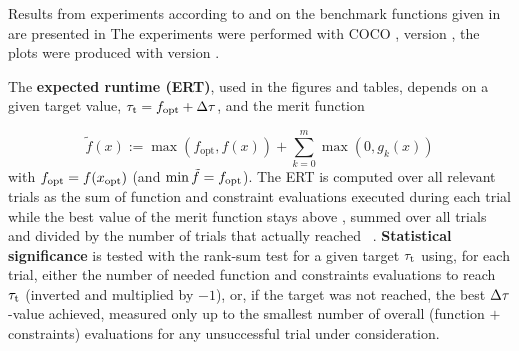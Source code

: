 \documentclass[sigconf]{acmart}
\begin{document}
Results from experiments according to \cite{hansen2016exp} and \cite{hansen2022anytime} on the
benchmark functions given in \cite{dufosse2022constrained} are
presented in
The experiments were performed with COCO \cite{hansen2020cocoplat}, version
\change{\version}, the plots were produced with version \change{\version}.

The \textbf{expected runtime (ERT)}, used in the figures and tables,
depends on a given target value, $\tau_\mathrm{t}=f_\mathrm{opt}+\Delta \tau$, and the merit
function

$$
\tilde{f}(x) := \max(f_{\text{opt}}, f(x))
+ \sum_{k=0}^{m} \max(0, g_k(x))
$$
with $f_\mathrm{opt} = f(x_{\text{opt}})$ (and $\min{\tilde{f}} = f_\mathrm{opt}$).
The ERT is computed over all relevant trials as the sum of
function and constraint evaluations executed during each trial
while the best value of the merit function stays above \fgtarget,
summed over all trials and divided by the
number of trials that actually reached \fgtarget\
\cite{dufosse2022constrained,hansen2012exp,price1997dev}. 
\textbf{Statistical significance} is tested with the rank-sum test for a given
target $\tau_\mathrm{t}$ using, for each trial,
either the number of needed function and constraints evaluations to reach
$\tau_\mathrm{t}$ (inverted and multiplied by $-1$), or, if the target
was not reached, the best $\Delta \tau$-value achieved, measured only up to
the smallest number of overall (function $+$ constraints) evaluations for any
unsuccessful trial under consideration.
\end{document}
